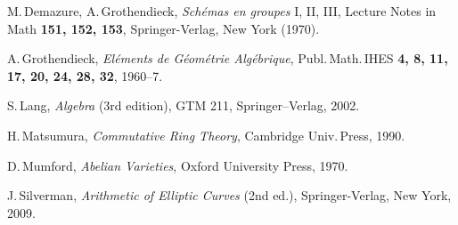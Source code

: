 \documentclass[10pt]{article}
\renewcommand{\(}{\left(}
\renewcommand{\)}{\right)}
\numberwithin{thm}{subsection}
\begin{document}
\begin{thebibliography}{BBBB}
 M.\,Demazure, A.\,Grothendieck, {\em Sch\'emas en groupes}
I, II, III, Lecture Notes in Math {\bf 151, 152, 153}, Springer-Verlag, New York (1970).


 A.\,Grothendieck, {\em El\'ements de G\'eom\'etrie Alg\'ebrique},
Publ.\,Math.\,IHES {\bf 4, 8, 11, 17, 20, 24, 28, 32}, 1960--7.  


%
%
 S.\,Lang, {\em Algebra} (3rd edition), GTM 211, Springer--Verlag, 2002. 
%

 H.\,Matsumura, {\em Commutative Ring Theory}, Cambridge Univ.\,Press, 1990.

 D.\,Mumford, {\em Abelian Varieties}, Oxford University Press, 1970. 

%
%

 J.\,Silverman, {\em Arithmetic of Elliptic Curves} (2nd ed.), Springer-Verlag, New York, 2009.

%
%
%
%
%
%



\end{thebibliography}
\end{document}
